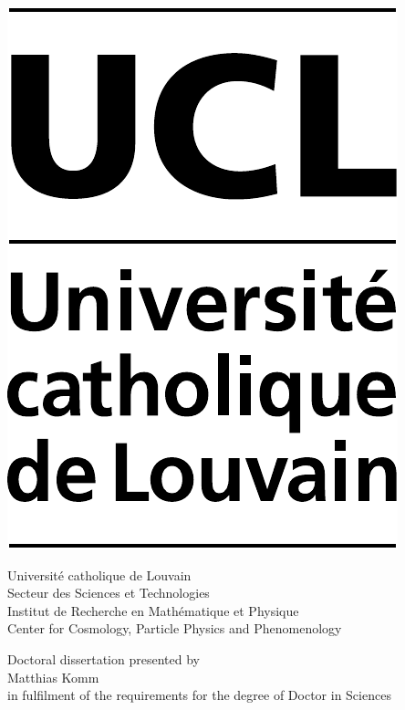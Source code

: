 \begin{clearedpagestyle}

\vspace*{0.5cm}

\parbox[c][][c]{0.2\textwidth}{
\includegraphics[height=2.cm]{figures/title/UCL.pdf}
}\parbox[c][][c]{0.799\textwidth}{\vspace{0.05cm}
\begin{flushright}
\large Universit{\'e} catholique de Louvain\\[0.25\baselineskip]
\normalsize Secteur des Sciences et Technologies\\[0.15\baselineskip] 
Institut de Recherche en Math{\'e}matique et Physique\\[0.15\baselineskip]
Center for Cosmology, Particle Physics and Phenomenology
\end{flushright}
}

\vspace{1.5cm}

\begin{center}

\vspace{0.3cm}

\parbox{0.95\textwidth}{
\fontsize{16}{25}\selectfont\centering
{}
}

\vspace{0.3cm}

\end{center}
\vspace{0.6cm}

\begin{center}
Doctoral dissertation presented by \\
\vspace{2mm}
{\Large Matthias Komm}\\
\vspace{2mm}
in fulfilment of the requirements for the degree of Doctor in Sciences
\end{center}

\vspace{\fill}


\end{clearedpagestyle}
